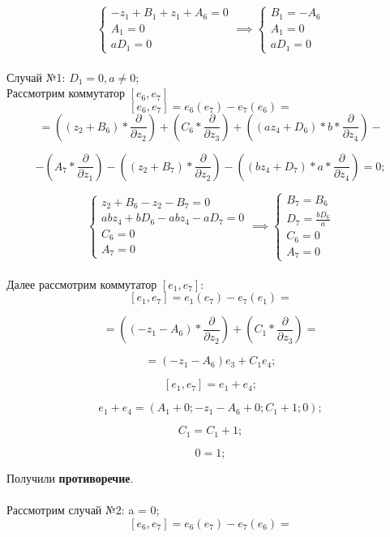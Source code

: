 \documentclass[12pt]{article}
\begin{document}
\[
\begin{cases}
-z_1 + B_1 + z_1 + A_6 = 0 \\
A_1 = 0 \\
aD_1 = 0
\end{cases}
\implies
\begin{cases}
B_1 = -A_6 \\
A_1 = 0 \\
aD_1 = 0
\end{cases}
\]\\

Случай №1: $D_1 = 0, a \neq 0$; \\
Рассмотрим коммутатор $[e_6, e_7]$
\[
[e_6, e_7] = e_6(e_7) - e_7(e_6) = 
\]
\[
= \left((z_2 + B_6) * \frac{\partial}{\partial z_2}\right)
+ \left(C_6 * \frac{\partial}{\partial z_3}\right)
+ \left((az_4 + D_6) * b * \frac{\partial}{\partial z_4}\right) - 
\]

\[
- \left(A_7 * \frac{\partial}{\partial z_1}\right)
- \left((z_2 + B_7) * \frac{\partial}{\partial z_2}\right)
- \left((bz_4 + D_7) * a * \frac{\partial}{\partial z_4}\right) = 0;
\]

\[
\begin{cases}
z_2 + B_6 - z_2 - B_7 = 0 \\
abz_4 + bD_6 - abz_4 - aD_7 = 0 \\
C_6 = 0 \\
A_7 = 0
\end{cases}
\implies
\begin{cases}
B_7 = B_6 \\
D_7 = \frac{bD_6}{a} \\
C_6 = 0 \\
A_7 = 0
\end{cases}
\]\\

Далее рассмотрим коммутатор $[e_1, e_7]$: 
\[
[e_1, e_7] = e_1(e_7) - e_7(e_1) = 
\]

\[
= \left((-z_1 - A_6) * \frac{\partial}{\partial z_2}\right)
+ \left(C_1 * \frac{\partial}{\partial z_3}\right) =
\]

\[
= (-z_1 - A_6)e_3 + C_1e_4;
\]

\[
[e_1, e_7] = e_1 + e_4;
\]

\[
e_1 + e_4 = \left(A_1 + 0; -z_1 - A_6 + 0; C_1 + 1; 0 \right);
\]

\[
C_1 = C_1 + 1;
\]

\[
0 = 1;
\]

Получили \textbf{противоречие}.\\\\
Рассмотрим случай №2: a = 0;
\[
[e_6, e_7] = e_6(e_7) - e_7(e_6) = 
\]
\end{document}
